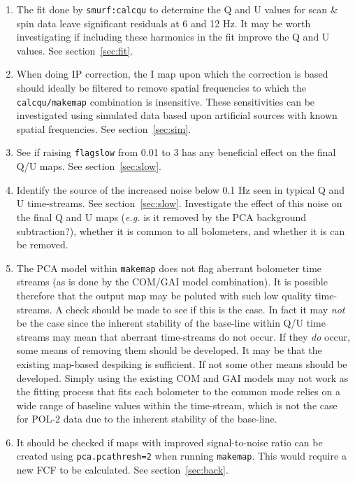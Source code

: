 \documentclass[twoside,11pt]{starlink}
\begin{document}
\begin{enumerate}
\item The fit done by \texttt{smurf:calcqu} to determine the Q and U
values for scan \& spin data leave significant residuals at 6 and 12 Hz.
It may be worth investigating if including these harmonics in the fit
improve the Q and U values. See section~\ref{sec:fit}.

\item When doing IP correction, the I map upon which the correction is
based should ideally be filtered to remove spatial frequencies to which
the \texttt{calcqu/makemap} combination is insensitive. These
sensitivities can be investigated using simulated data based upon
artificial sources with known spatial frequencies. See
section~\ref{sec:sim}.

\item See if raising \texttt{flagslow} from 0.01 to 3 has any beneficial
effect on the final Q/U maps. See section~\ref{sec:slow}.

\item Identify the source of the increased noise below 0.1 Hz seen in
typical Q and U time-streams. See section~\ref{sec:slow}. Investigate the
effect of this noise on the final Q and U maps (\emph{e.g.} is it removed
by the PCA background subtraction?), whether it is common to
all bolometers, and whether it is can be removed.

\item The PCA model within \texttt{makemap} does not flag aberrant bolometer
time streams (as is done by the COM/GAI model combination). It is
possible therefore that the output map may be poluted with such low quality
time-streams. A check should be made to see if this is the case. In fact
it may \emph{not} be the case since the inherent stability of the
base-line within Q/U time streams may mean that aberrant time-streams do
not occur.  If they \emph{do} occur, some means of removing them should be
developed. It may be that the existing map-based despiking is sufficient.
If not some other means should be developed. Simply using the existing
COM and GAI models may not work as the fitting process that fits each
bolometer to the common mode relies on a wide range of baseline values
within the time-stream, which is not the case for POL-2 data due to the
inherent stability of the base-line.

\item It should be checked if maps with improved signal-to-noise ratio
can be created using \texttt{pca.pcathresh=2} when running
\texttt{makemap}. This would require a new FCF to be calculated. See
section~\ref{sec:back}.


\end{enumerate}
\end{document}
